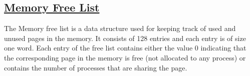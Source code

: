 \subsection{\href{http://exposnitc.github.io/os_design-files/mem_ds.html#mem_free_list}{Memory Free List}}

The Memory free list is a data structure used for keeping track of used and unused pages in the memory. It consists of 128 entries and each entry is of size one word. Each entry of the free list contains either the value 0 indicating that the corresponding page in the memory is free (not allocated to any process) or contains the number of processes that are sharing the page. 
